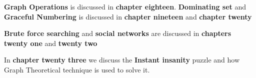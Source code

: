 \textbf{Graph Operations} is discussed in \textbf{chapter eighteen}. \textbf{Dominating set} and \textbf{Graceful Numbering} is discussed in \textbf{chapter nineteen} and \textbf{chapter twenty}

\textbf{Brute force searching} and \textbf{social networks} are discussed in \textbf{chapters twenty one} and \textbf{twenty two}

In \textbf{chapter twenty three} we discuss the \textbf{Instant insanity} puzzle and how Graph Theoretical 
technique is used to solve it.








